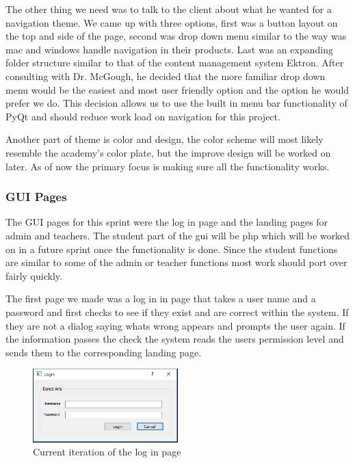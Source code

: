 The other thing we need was to talk to the client about what he wanted for a navigation theme. We came up with three options, first was a button layout on the top and side of the page, second was  drop down menu similar to the way was mac and windows handle navigation in their products. Last was an expanding folder structure similar to that of the content management system Ektron. After consulting with Dr. McGough, he  decided that the more familiar drop down menu would be the easiest and most user friendly option and the option he would prefer we do. This decision allows us to use the built in menu bar functionality of PyQt and should reduce work load on navigation for this project.

Another part of theme is color and design, the color scheme will most likely resemble the academy's color plate, but the improve design will be worked on later. As of now the primary focus is making sure all the functionality works.


\subsubsection{GUI Pages}

The GUI pages for this sprint were the log in page and the landing pages for admin and teachers. The student part of the gui will be php which will be worked on in a future sprint once the functionality is done. Since the student functions are similar to some of the admin or teacher functions most work should port over fairly quickly.

The first page we made was a log in in page that takes a user name and a password and first checks to see if they exist and are correct within the system. If they are not a dialog saying whats wrong appears and prompts the user again. If the information passes the check the system reads the users permission level and sends them to the corresponding landing page.

\begin{figure}
\caption{Current iteration of the log in page}
\centering
\includegraphics[width=0.5\textwidth]{login_page}
\end{figure}

